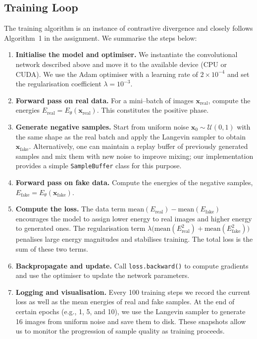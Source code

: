 \subsection{Training Loop}

The training algorithm is an instance of contrastive divergence and closely
follows Algorithm~1 in the assignment.  We summarise the steps below:

\begin{enumerate}[leftmargin=*,label=\arabic*.]
  \item \textbf{Initialise the model and optimiser.}  We instantiate the
    convolutional network described above and move it to the available
    device (CPU or CUDA).  We use the Adam optimiser with a learning rate
    of $2\times 10^{-4}$ and set the regularisation coefficient
    $\lambda=10^{-3}$.
  \item \textbf{Forward pass on real data.}  For a mini–batch of
    images $\mathbf{x}_{\text{real}}$, compute the energies
    $E_{\text{real}} = E_\theta(\mathbf{x}_{\text{real}})$.  This constitutes
    the positive phase.
  \item \textbf{Generate negative samples.}  Start from uniform noise
    $\mathbf{x}_0 \sim \mathcal{U}(0,1)$ with the same shape as the real
    batch and apply the Langevin sampler to obtain
    $\mathbf{x}_{\text{fake}}$.  Alternatively, one can maintain a replay
    buffer of previously generated samples and mix them with new noise to
    improve mixing; our implementation provides a simple \texttt{SampleBuffer}
    class for this purpose.
  \item \textbf{Forward pass on fake data.}  Compute the energies of the
    negative samples, $E_{\text{fake}} = E_\theta(\mathbf{x}_{\text{fake}})$.
  \item \textbf{Compute the loss.}  The data term
    $\mathrm{mean}(E_{\text{real}}) - \mathrm{mean}(E_{\text{fake}})$
    encourages the model to assign lower energy to real images and higher
    energy to generated ones.  The regularisation term
    $\lambda\big(\mathrm{mean}(E_{\text{real}}^2) + \mathrm{mean}(E_{\text{fake}}^2)\big)$
    penalises large energy magnitudes and stabilises training.  The total
    loss is the sum of these two terms.
  \item \textbf{Backpropagate and update.}  Call
    \texttt{loss.backward()} to compute gradients and use the optimiser to
    update the network parameters.
  \item \textbf{Logging and visualisation.}  Every 100 training steps we
    record the current loss as well as the mean energies of real and fake
    samples.  At the end of certain epochs (e.g., 1, 5, and 10), we use the
    Langevin sampler to generate 16 images from uniform noise and save
    them to disk.  These snapshots allow us to monitor the progression of
    sample quality as training proceeds.
\end{enumerate}

